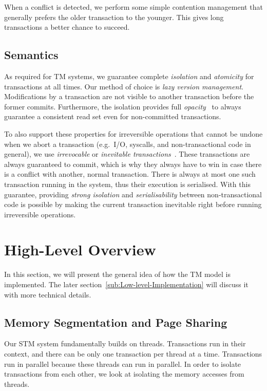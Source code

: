 \documentclass{sigplanconf}
\begin{document}
When a conflict is detected, we perform some simple contention
management that generally prefers the older transaction to the younger.
This gives long transactions a better chance to succeed.

\subsection{Semantics}

As required for TM systems, we guarantee complete \emph{isolation} and
\emph{atomicity} for transactions at all times. Our method of choice
is \emph{lazy version management}. Modifications by a transaction are
not visible to another transaction before the former commits.
Furthermore, the isolation provides full
\emph{opacity}~\cite{guerraoui08} to always guarantee a consistent
read set even for non-committed transactions.

To also support these properties for irreversible operations that
cannot be undone when we abort a transaction (e.g.\ I/O, syscalls, and
non-transactional code in general), we use \emph{irrevocable} or
\emph{inevitable transactions}~\cite{blundell06,spear08}. These transactions are always
guaranteed to commit, which is why they always have to win in case
there is a conflict with another, normal transaction. There is always
at most one such transaction running in the system, thus their
execution is serialised. With this guarantee, providing \emph{strong
isolation} and \emph{serialisability} between non-transactional code
is possible by making the current transaction inevitable right before
running irreversible operations.



\section{High-Level Overview}

In this section, we will present the general idea of how the TM model is
implemented.  The later section~\ref{sub:Low-level-Implementation} will
discuss it with more technical details.

\subsection{Memory Segmentation and Page Sharing}

Our STM system fundamentally builds on threads. Transactions run in
their context, and there can be only one transaction per thread at a
time. Transactions run in parallel because these threads can run in
parallel. In order to isolate transactions from each other, we look
at isolating the memory accesses from threads.
\end{document}
